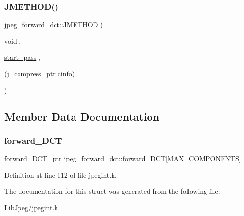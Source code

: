 \subsubsection{\texorpdfstring{JMETHOD()}{JMETHOD()}}
{\footnotesize\ttfamily jpeg\+\_\+forward\+\_\+dct\+::\+J\+M\+E\+T\+H\+OD (\begin{DoxyParamCaption}\item[{void}]{,  }\item[{\mbox{\hyperlink{jddctmgr_8c_a1964f006adb8fb80f57e455f6452aec1}{start\+\_\+pass}}}]{,  }\item[{(\mbox{\hyperlink{jpeglib_8h_add2a072c54e3a51550f4975f7ddb91e7}{j\+\_\+compress\+\_\+ptr}} cinfo)}]{ }\end{DoxyParamCaption})}



\subsection{Member Data Documentation}
\mbox{\label{structjpeg__forward__dct_a227dc1b935c81ac94fc81521be709faf}} 
\subsubsection{\texorpdfstring{forward\_DCT}{forward\_DCT}}
{\footnotesize\ttfamily forward\+\_\+\+D\+C\+T\+\_\+ptr jpeg\+\_\+forward\+\_\+dct\+::forward\+\_\+\+D\+CT\mbox{[}\mbox{\hyperlink{jmorecfg_8h_a6d8c910a1fdb6d4762a05f7250e64322}{M\+A\+X\+\_\+\+C\+O\+M\+P\+O\+N\+E\+N\+TS}}\mbox{]}}



Definition at line 112 of file jpegint.\+h.



The documentation for this struct was generated from the following file\+:\begin{DoxyCompactItemize}
\item 
Lib\+Jpeg/\mbox{\hyperlink{jpegint_8h}{jpegint.\+h}}\end{DoxyCompactItemize}
